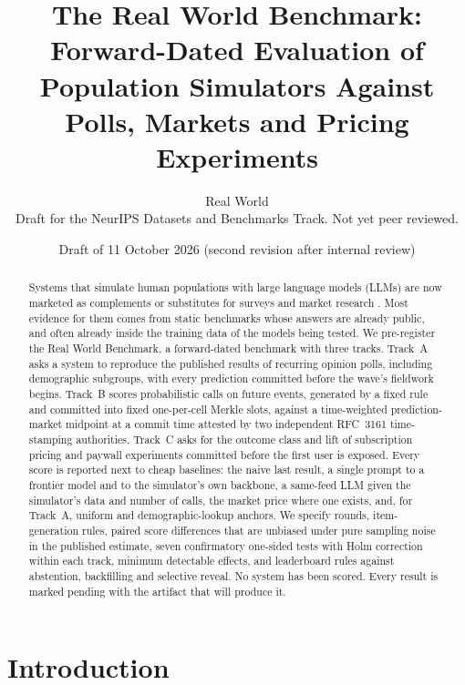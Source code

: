 \documentclass[11pt]{article}
\title{The Real World Benchmark: Forward-Dated Evaluation of\\Population Simulators Against Polls, Markets and Pricing Experiments}
\author{Real World\\\small Draft for the NeurIPS Datasets and Benchmarks Track. Not yet peer reviewed.}
\date{Draft of 11 October 2026 (second revision after internal review)}
\begin{document}
\maketitle

\begin{abstract}
Systems that simulate human populations with large language models (LLMs) are now marketed as complements or substitutes for surveys and market research \citep{brand2025llms,researchlive2026strat7}. Most evidence for them comes from static benchmarks whose answers are already public, and often already inside the training data of the models being tested. We pre-register the Real World Benchmark, a forward-dated benchmark with three tracks. Track~A asks a system to reproduce the published results of recurring opinion polls, including demographic subgroups, with every prediction committed before the wave's fieldwork begins. Track~B scores probabilistic calls on future events, generated by a fixed rule and committed into fixed one-per-cell Merkle slots, against a time-weighted prediction-market midpoint at a commit time attested by two independent RFC~3161 time-stamping authorities. Track~C asks for the outcome class and lift of subscription pricing and paywall experiments committed before the first user is exposed. Every score is reported next to cheap baselines: the naive last result, a single prompt to a frontier model and to the simulator's own backbone, a same-feed LLM given the simulator's data and number of calls, the market price where one exists, and, for Track~A, uniform and demographic-lookup anchors. We specify rounds, item-generation rules, paired score differences that are unbiased under pure sampling noise in the published estimate, seven confirmatory one-sided tests with Holm correction within each track, minimum detectable effects, and leaderboard rules against abstention, backfilling and selective reveal. No system has been scored. Every result is marked pending with the artifact that will produce it.
\end{abstract}

\section{Introduction}
\end{document}
